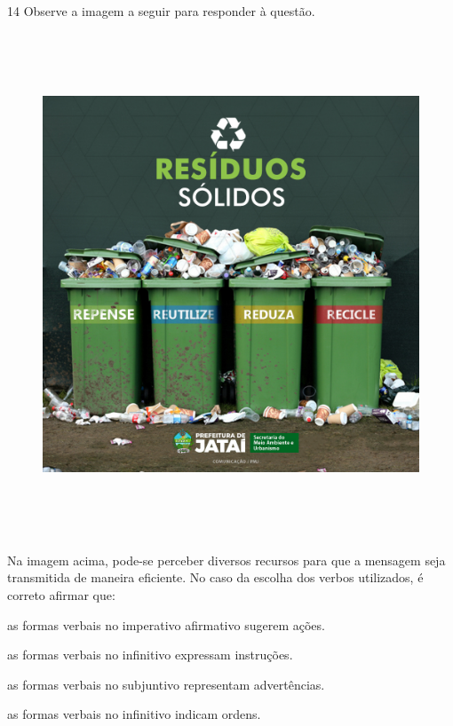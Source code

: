 \pagebreak

\num{14} Observe a imagem a seguir para responder à questão.

\begin{figure}[H]
\includegraphics[width=5.90551in,height=5.90278in]{./imgSAEB_7_POR/media/image19.png}
\end{figure}


Na imagem acima, pode-se perceber diversos recursos para que a mensagem
seja transmitida de maneira eficiente. No caso da escolha dos
verbos utilizados, é correto afirmar que:

\begin{escolha}

    \item as formas verbais no imperativo afirmativo sugerem ações.

    \item as formas verbais no infinitivo expressam instruções.

    \item as formas verbais no subjuntivo representam advertências.

    \item as formas verbais no infinitivo indicam ordens.

\end{escolha}

